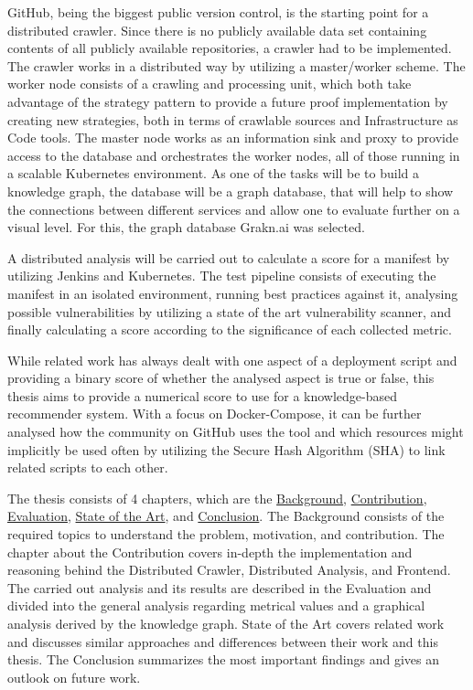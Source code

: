GitHub, being the biggest public version control, is the starting point for a distributed crawler. Since there is no publicly available data set containing contents of all publicly available repositories, a crawler had to be implemented. The crawler works in a distributed way by utilizing a master/worker scheme. The worker node consists of a crawling and processing unit, which both take advantage of the strategy pattern to provide a future proof implementation by creating new strategies, both in terms of crawlable sources and Infrastructure as Code tools. The master node works as an information sink and proxy to provide access to the database and orchestrates the worker nodes, all of those running in a scalable Kubernetes environment.
As one of the tasks will be to build a knowledge graph, the database will be a graph database, that will help to show the connections between different services and allow one to evaluate further on a visual level. For this, the graph database Grakn.ai was selected.

A distributed analysis will be carried out to calculate a score for a manifest by utilizing Jenkins and Kubernetes. The test pipeline consists of executing the manifest in an isolated environment, running best practices against it, analysing possible vulnerabilities by utilizing a state of the art vulnerability scanner, and finally calculating a score according to the significance of each collected metric.

While related work has always dealt with one aspect of a deployment script and providing a binary score of whether the analysed aspect is true or false, this thesis aims to provide a numerical score to use for a knowledge-based recommender system. With a focus on Docker-Compose, it can be further analysed how the community on GitHub uses the tool and which resources might implicitly be used often by utilizing the Secure Hash Algorithm (SHA) to link related scripts to each other.

The thesis consists of 4 chapters, which are the \hyperref[sec:background]{Background}, \hyperref[sec:contribution]{Contribution}, \hyperref[sec:evaluation]{Evaluation}, \hyperref[sec:stateofart]{State of the Art}, and \hyperref[sec:conclusion]{Conclusion}. The Background consists of the required topics to understand the problem, motivation, and contribution. The chapter about the Contribution covers in-depth the implementation and reasoning behind the Distributed Crawler, Distributed Analysis, and Frontend. The carried out analysis and its results are described in the Evaluation and divided into the general analysis regarding metrical values and a graphical analysis derived by the knowledge graph. State of the Art covers related work and discusses similar approaches and differences between their work and this thesis. The Conclusion summarizes the most important findings and gives an outlook on future work.